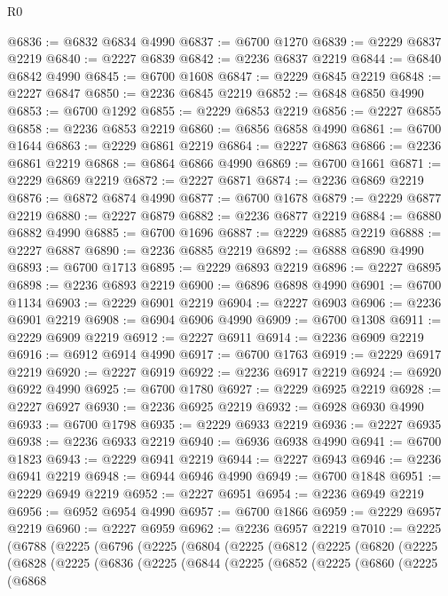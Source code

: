 \begin{lexlean}{R0}
\begin{coremodule}
@6836 := @6832 @6834 @4990
@6837 := @6700 @1270
@6839 := @2229 @6837 @2219
@6840 := @2227 @6839
@6842 := @2236 @6837 @2219
@6844 := @6840 @6842 @4990
@6845 := @6700 @1608
@6847 := @2229 @6845 @2219
@6848 := @2227 @6847
@6850 := @2236 @6845 @2219
@6852 := @6848 @6850 @4990
@6853 := @6700 @1292
@6855 := @2229 @6853 @2219
@6856 := @2227 @6855
@6858 := @2236 @6853 @2219
@6860 := @6856 @6858 @4990
@6861 := @6700 @1644
@6863 := @2229 @6861 @2219
@6864 := @2227 @6863
@6866 := @2236 @6861 @2219
@6868 := @6864 @6866 @4990
@6869 := @6700 @1661
@6871 := @2229 @6869 @2219
@6872 := @2227 @6871
@6874 := @2236 @6869 @2219
@6876 := @6872 @6874 @4990
@6877 := @6700 @1678
@6879 := @2229 @6877 @2219
@6880 := @2227 @6879
@6882 := @2236 @6877 @2219
@6884 := @6880 @6882 @4990
@6885 := @6700 @1696
@6887 := @2229 @6885 @2219
@6888 := @2227 @6887
@6890 := @2236 @6885 @2219
@6892 := @6888 @6890 @4990
@6893 := @6700 @1713
@6895 := @2229 @6893 @2219
@6896 := @2227 @6895
@6898 := @2236 @6893 @2219
@6900 := @6896 @6898 @4990
@6901 := @6700 @1134
@6903 := @2229 @6901 @2219
@6904 := @2227 @6903
@6906 := @2236 @6901 @2219
@6908 := @6904 @6906 @4990
@6909 := @6700 @1308
@6911 := @2229 @6909 @2219
@6912 := @2227 @6911
@6914 := @2236 @6909 @2219
@6916 := @6912 @6914 @4990
@6917 := @6700 @1763
@6919 := @2229 @6917 @2219
@6920 := @2227 @6919
@6922 := @2236 @6917 @2219
@6924 := @6920 @6922 @4990
@6925 := @6700 @1780
@6927 := @2229 @6925 @2219
@6928 := @2227 @6927
@6930 := @2236 @6925 @2219
@6932 := @6928 @6930 @4990
@6933 := @6700 @1798
@6935 := @2229 @6933 @2219
@6936 := @2227 @6935
@6938 := @2236 @6933 @2219
@6940 := @6936 @6938 @4990
@6941 := @6700 @1823
@6943 := @2229 @6941 @2219
@6944 := @2227 @6943
@6946 := @2236 @6941 @2219
@6948 := @6944 @6946 @4990
@6949 := @6700 @1848
@6951 := @2229 @6949 @2219
@6952 := @2227 @6951
@6954 := @2236 @6949 @2219
@6956 := @6952 @6954 @4990
@6957 := @6700 @1866
@6959 := @2229 @6957 @2219
@6960 := @2227 @6959
@6962 := @2236 @6957 @2219
@7010 := @2225
    (@6788
      (@2225
        (@6796
          (@2225
            (@6804
              (@2225
                (@6812
                  (@2225
                    (@6820
                      (@2225
                        (@6828
                          (@2225
                            (@6836
                              (@2225
                                (@6844
                                  (@2225
                                    (@6852
                                      (@2225
                                        (@6860
                                          (@2225
                                            (@6868

\end{coremodule}
\end{lexlean}
